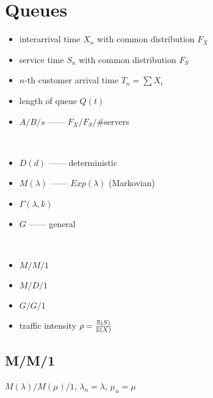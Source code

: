 \section{Queues}\label{sec:queues}

\begin{itemize}
    \item interarrival time $X_n$ with common distribution $F_X$
    \item service time $S_n$ with common distribution $F_S$
    \item $n$-th customer arrival time $T_n = \sum X_i$
    \item length of queue $Q(t)$
    \item $A/B/s$ ------ $F_X/F_S/\# $servers
\end{itemize}

\begin{example}\,
    \begin{itemize}
        \item $D(d)$ ------ deterministic
        \item $M(\lambda)$ ------ $Exp(\lambda)$ (Markovian)
        \item $\Gamma(\lambda, k)$
        \item $G$ ------ general
    \end{itemize}
\end{example}

\begin{example}\,
    \begin{itemize}
        \item $M/M/1$
        \item $M/D/1$
        \item $G/G/1$
    \end{itemize}
\end{example}

\begin{itemize}
    \item traffic intensity $\rho = \frac{\mathbb{E}(S)}{\mathbb{E}(X)}$
\end{itemize}

\subsection{M/M/1}\label{subsec:MM1}

\begin{setting}
    $M(\lambda)/M(\mu)/1$, $\lambda_n = \lambda$, $\mu_n = \mu$
\end{setting}

